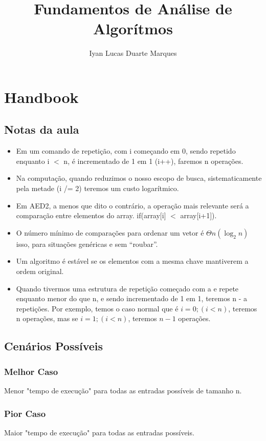 \documentclass[12pt]{article}
\title{Fundamentos de Análise de Algorítmos}
\author{Iyan Lucas Duarte Marques\inst{1}}
\begin{document}
\maketitle
\section{Handbook}
    \subsection{Notas da aula}
    \begin{itemize}
        \item Em um comando de repetição, com i começando em 0, sendo repetido enquanto i $<$ n, é incrementado de 1 em 1 (i++), faremos n operações.
        \item Na computação, quando reduzimos o nosso escopo de busca, sistematicamente pela metade (i /= 2) teremos um custo logarítmico.
        \item Em AED2, a menos que dito o contrário, a operação mais relevante será a comparação entre elementos do array. if(array[i] $<$ array[i+1]).
        \item O número mínimo de comparações para ordenar um vetor é $\Theta n(\log_2n)$ isso, para situações genéricas e sem “roubar”.
        \item Um algoritmo é estável se os elementos com a mesma chave mantiverem a ordem original.
        \item Quando tivermos uma estrutura de repetição começado com a e repete enquanto menor do que n, e sendo incrementado de 1 em 1, teremos n - a repetições.
        Por exemplo, temos o caso normal que é $i = 0;(i < n)$, teremos n operações, mas se $i = 1;(i < n)$, teremos $n - 1$ operações.


    \end{itemize}
    \subsection{Cenários Possíveis}
        \subsubsection{Melhor Caso}
            Menor "tempo de execução" para todas as entradas possíveis de tamanho n.
        \subsubsection{Pior Caso}
            Maior "tempo de execução" para todas as entradas possíveis.    
\end{document}
